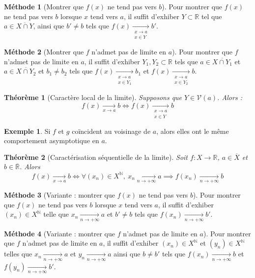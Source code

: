 \documentclass[french]{book}
\newcommand{\N}{\mathbb{N}}
\newcommand{\R}{\mathbb{R}}
\theoremstyle{plain}
\newtheorem{thm}{Théorème}[chapter]
\theoremstyle{definition}
\newtheorem{exa}{Exemple}[chapter]
\newtheorem{met}{Méthode}[chapter]
\theoremstyle{remark}
\begin{document}
\begin{met}[Montrer que $f(x)$ ne tend pas vers $b$]
	Pour montrer que $f(x)$ ne tend pas vers $b$ lorsque $x$ tend vers $a$, il suffit d'exhiber $Y\subset\R$ tel que $a\in\overline{X\cap Y}$, ainsi que $b'\ne b$ tels que $f(x)\xrightarrow[\substack{x\to a\\ x\in Y}]{}b'$.
\end{met}
\begin{met}[Montrer que $f$ n'admet pas de limite en $a$]
	Pour montrer que $f$ n'admet pas de limite en $a$, il suffit d'exhiber $Y_1,Y_2\subset\R$ tels que $a\in\overline{X\cap Y_1}$ et $a\in\overline{X\cap Y_2}$ et $b_1\ne b_2$ tels que $f(x)\xrightarrow[\substack{x\to a\\ x\in Y_1}]{}b_1$ et $f(x)\xrightarrow[\substack{x\to a\\ x\in Y_2}]{}b$.
\end{met}
\begin{thm}[Caractère local de la limite]
	Supposons que $Y\in\mathcal{V}(a)$. Alors : $$f(x)\xrightarrow[x\to a]{}b \iff f(x)\xrightarrow[\substack{x\to a\\ x\in Y}]{}b$$
\end{thm}
\begin{exa}
	Si $f$ et $g$ coïncident au voisinage de $a$, alors elles ont le même comportement asymptotique en $a$.
\end{exa}
\begin{thm}[Caractérisation séquentielle de la limite]
	Soit $f:X\rightarrow\R$, $a\in\overline{X}$ et $b\in\overline{\R}$. Alors $$f(x)\xrightarrow[x\to a]{}b\iff \forall(x_n)\in X^\N,\ x_n\xrightarrow[n\to+\infty]{}a\implies f(x_n)\xrightarrow[n\to +\infty]{}b$$
\end{thm}
\begin{met}[Variante : montrer que $f(x)$ ne tend pas vers $b$]
	Pour montrer que $f(x)$ ne tend pas vers $b$ lorsque $x$ tend vers $a$, il suffit d'exhiber $(x_n)\in X^\N$ telle que $x_n\xrightarrow[n\to+\infty]{}a$ et $b'\ne b$ tels que $f(x_n)\xrightarrow[n\to+\infty]{}b'$.
\end{met}
\begin{met}[Variante : montrer que $f$ n'admet pas de limite en $a$]
	Pour montrer que $f$ n'admet pas de limite en $a$, il suffit d'exhiber $(x_n)\in X^\N$ et $(y_n)\in X^\N$ telles que $x_n\xrightarrow[n\to+\infty]{}a$ et $y_n\xrightarrow[n\to+\infty]{}a$ ainsi que $b\ne b'$ tels que $f(x_n)\xrightarrow[n\to+\infty]{}b$ et $f(y_n)\xrightarrow[n\to+\infty]{}b'$.
\end{met}
\end{document}
